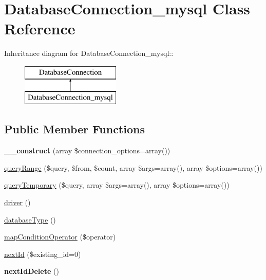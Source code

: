 \hypertarget{classDatabaseConnection__mysql}{
\section{DatabaseConnection\_\-mysql Class Reference}
\label{classDatabaseConnection__mysql}
}
Inheritance diagram for DatabaseConnection\_\-mysql::\begin{figure}[H]
\begin{center}
\leavevmode
\includegraphics[height=2cm]{classDatabaseConnection__mysql}
\end{center}
\end{figure}
\subsection*{Public Member Functions}
\begin{DoxyCompactItemize}
\item 
\hypertarget{classDatabaseConnection__mysql_afae51ae3fa57a905589607e88ef00576}{
{\bfseries \_\-\_\-construct} (array \$connection\_\-options=array())}
\label{classDatabaseConnection__mysql_afae51ae3fa57a905589607e88ef00576}

\item 
\hyperlink{classDatabaseConnection__mysql_a8fa3e83f5a5e85e85d2b06247a8d8a24}{queryRange} (\$query, \$from, \$count, array \$args=array(), array \$options=array())
\item 
\hyperlink{classDatabaseConnection__mysql_a928309f48ddbeeca25328fec33c4ab9e}{queryTemporary} (\$query, array \$args=array(), array \$options=array())
\item 
\hyperlink{classDatabaseConnection__mysql_a84daa0617157e0c291b081c7c648dc05}{driver} ()
\item 
\hyperlink{classDatabaseConnection__mysql_a983f8932fcaa5f3806c78e28841e7a5b}{databaseType} ()
\item 
\hyperlink{classDatabaseConnection__mysql_a8d36611a923f44b9dd5d1ed05ba84eb3}{mapConditionOperator} (\$operator)
\item 
\hyperlink{classDatabaseConnection__mysql_a89a5362c5a53f7e2a60e75076a4cba11}{nextId} (\$existing\_\-id=0)
\item 
\hypertarget{classDatabaseConnection__mysql_a59aa65d392fbd8ba63a455e43b5e94ac}{
{\bfseries nextIdDelete} ()}
\label{classDatabaseConnection__mysql_a59aa65d392fbd8ba63a455e43b5e94ac}

\end{DoxyCompactItemize}
